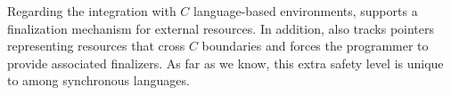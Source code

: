Regarding the integration with $C$ language-based environments, \CEU
supports a finalization mechanism for external resources.
%
In addition, \CEU also tracks pointers representing resources that cross $C$
boundaries and forces the programmer to provide associated finalizers.
%
As far as we know, this extra safety level is unique to \CEU among synchronous
languages.
